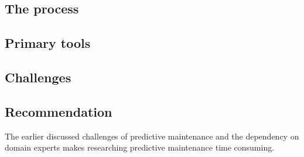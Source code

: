\subsection{The process}

\subsection{Primary tools}


\subsection{Challenges}

\subsection{Recommendation}
The earlier discussed challenges of predictive maintenance and the dependency on domain experts makes researching predictive maintenance time consuming. 